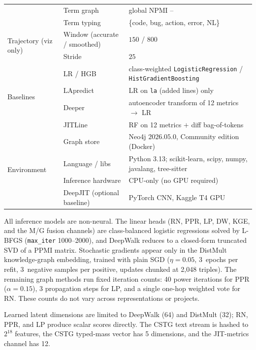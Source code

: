 \documentclass[final,5p,times,twocolumn]{elsarticle}
\DeclareRobustCommand{\code}[1]{%
  \ifmmode
    \text{\normalfont\ttfamily\detokenize{#1}}%
  \else
    {\normalfont\ttfamily\detokenize{#1}}%
  \fi
}
\DeclareRobustCommand{\node}[1]{\code{#1}}
\theoremstyle{plain}
\begin{document}
\begin{table}[!htbp]
{\begin{tabular}{lll}
 & Term graph                  & global NPMI \node{Term}--\node{Term} \\
 & Term typing                 & \{code, bug, action, error, NL\} \\
\midrule
\multirow{2}{*}{Trajectory (viz only)}
 & Window (accurate / smoothed)& $150$ / $800$ \\
 & Stride                      & $25$ \\
\midrule
\multirow{4}{*}{Baselines}
 & LR / HGB                    & class-weighted \texttt{LogisticRegression} / \texttt{HistGradientBoosting} \\
 & LApredict                   & LR on \texttt{la} (added lines) only \\
 & Deeper                      & autoencoder transform of 12 metrics $\to$ LR \\
 & JITLine                     & RF on 12 metrics $+$ diff bag-of-tokens \\
\midrule
\multirow{4}{*}{Environment}
 & Graph store                 & Neo4j $2026.05.0$, Community edition (Docker) \\
 & Language / libs             & Python 3.13; scikit-learn, scipy, numpy, javalang, tree-sitter \\
 & Inference hardware          & CPU-only (no GPU required) \\
 & DeepJIT (optional baseline) & PyTorch CNN, Kaggle T4 GPU \\
\bottomrule
\end{tabular}}
\end{table}

All inference models are non-neural. The linear heads (RN, PPR, LP, DW, KGE, and the M/G fusion channels) are class-balanced logistic regressions solved by L-BFGS (\texttt{max\_iter} 1000--2000), and DeepWalk reduces to a closed-form truncated SVD of a PPMI matrix. Stochastic gradients appear only in the DistMult knowledge-graph embedding, trained with plain SGD ($\eta=0.05$, 3~epochs per refit, 3~negative samples per positive, updates chunked at 2{,}048 triples). The remaining graph methods run fixed iteration counts: 40 power iterations for PPR ($\alpha=0.15$), 3 propagation steps for LP, and a single one-hop weighted vote for RN. These counts do not vary across representations or projects.

Learned latent dimensions are limited to DeepWalk (64) and DistMult (32); RN, PPR, and LP produce scalar scores directly. The CSTG text stream is hashed to $2^{18}$ features, the CSTG typed-mass vector has 5 dimensions, and the JIT-metrics channel has 12.
\end{document}
